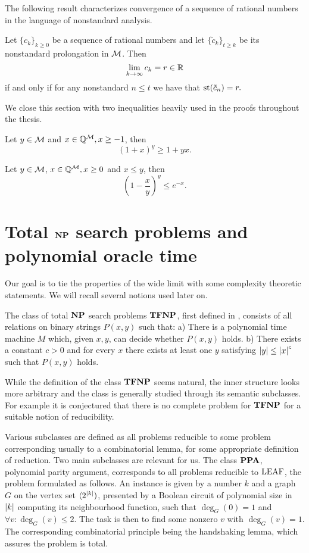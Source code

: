 The following result characterizes convergence of a sequence of rational numbers in the language of nonstandard analysis.

\begin{thrm*}
Let $\{c_k\}_{k\geq 0}$ be a sequence of rational numbers and let $\{\tilde c_k\}_{t\geq k}$ be its nonstandard prolongation in $\mathcal{M}$. Then \[\lim_{k\to\infty}c_k = r \in \mathbb{R}\]
if and only if for any nonstandard $n\leq t$ we have that
$\text{st}(\tilde c_n)=r.$
\end{thrm*}

We close this section with two inequalities heavily used in the proofs throughout the thesis.

\begin{thrm*}
Let $y \in \mathcal{M}$ and $x\in \mathbb{Q}^{\mathcal{M}}, x\geq -1$, then
\[(1+x)^y \geq 1+yx.\]
\end{thrm*}

\begin{thrm*}
Let $y \in \mathcal{M}$, $x\in \mathbb{Q}^{\mathcal{M}}, x\geq 0$ and $x\leq y$, then
\[\left(1-\frac{x}{y}\right)^y \leq e^{-x}.\]
\end{thrm*}

\section*{Total $\textbf{NP}$ search problems and polynomial oracle time}

Our goal is to tie the properties of the wide limit with some complexity theoretic statements. We will recall several notions used later on.

The class of total $\textbf{NP}$ search problems $\textbf{TFNP}$, first defined in \cite{megiddo1991total}, consists of all relations on binary strings $P(x,y)$ such that: a) There is a polynomial time machine $M$ which, given $x,y$, can decide whether $P(x,y)$ holds. b) There exists a constant $c>0$ and for every $x$ there exists at least one $y$ satisfying $\left|{y}\right|\leq \left|{x}\right|^c$ such that $P(x,y)$ holds.

While the definition of the class $\textbf{TFNP}$ seems natural, the inner structure looks more arbitrary and the class is generally studied through its semantic subclasses. For example it is conjectured that there is no complete problem for $\textbf{TFNP}$ \cite{goldberg2018tfnp} for a suitable notion of reducibility.

Various subclasses are defined as all problems reducible to some problem corresponding usually to a combinatorial lemma, for some appropriate definition of reduction. Two main subclasses are relevant for us. The class $\textbf{PPA}$, polynomial parity argument, corresponds to all problems reducible to $\text{LEAF}$, the problem formulated as follows. An instance is given by a number $k$ and a graph $G$ on the vertex set $\langle 2^{\left|{k}\right|})$, presented by a Boolean circuit of polynomial size in $\left|{k}\right|$ computing its neighbourhood function, such that $\deg_G(0)=1$ and $\forall v: \deg_G(v)\leq 2$. The task is then to find some nonzero $v$ with $\deg_G(v)=1$. The corresponding combinatorial principle being the handshaking lemma, which assures the problem is total.

